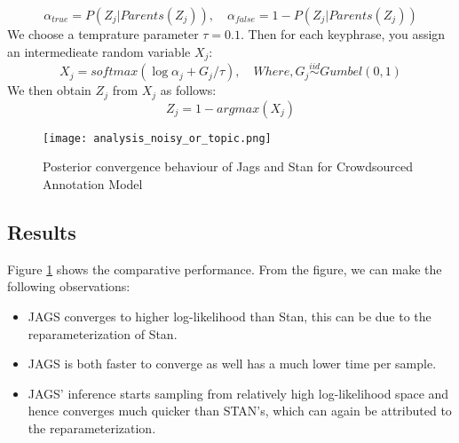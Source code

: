 \documentclass[../main.tex]{subfiles}
\begin{document}
$$
\alpha_{true} = P(Z_j|Parents(Z_j)), \quad \alpha_{false} = 1 - P(Z_j|Parents(Z_j))
$$
We choose a temprature parameter $\tau = 0.1$.
Then for each keyphrase, you assign an intermedieate random variable $X_j$:
$$
X_j = softmax(\log\alpha_j + G_j/\tau), \quad Where, G_j \stackrel{iid}{\sim} Gumbel(0,1)
$$
We then obtain $Z_j$ from $X_j$ as follows:
$$
Z_j = 1 - argmax(X_j)
$$
\begin{figure}[h]
  \centering
  \texttt{[image: analysis\_noisy\_or\_topic.png]}
  \caption{Posterior convergence behaviour of Jags and Stan for Crowdsourced Annotation Model}
  \label{fig:fig2}
\end{figure}

\subsection{Results}
Figure \ref{fig:fig2} shows the comparative performance.
From the figure, we can make the following observations:
\begin{itemize}
\item JAGS converges to higher log-likelihood than Stan, this can be due to the reparameterization of Stan.
\item JAGS is both faster to converge as well has a much lower time per sample.
\item JAGS' inference starts sampling from relatively high log-likelihood space  and hence converges much quicker than STAN's, which can again be attributed to the reparameterization.
\end{itemize}
\end{document}
